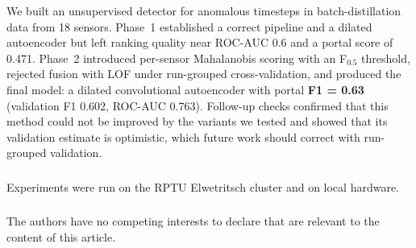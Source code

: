 \documentclass[runningheads]{llncs}
\begin{document}
We built an unsupervised detector for anomalous timesteps in batch-distillation data from 18 sensors. Phase~1 established a correct pipeline and a dilated autoencoder but left ranking quality near ROC-AUC 0.6 and a portal score of 0.471. Phase~2 introduced per-sensor Mahalanobis scoring with an F$_{0.5}$ threshold, rejected fusion with LOF under run-grouped cross-validation, and produced the final model: a dilated convolutional autoencoder with portal \textbf{F1 = 0.63} (validation F1 0.602, ROC-AUC 0.763). Follow-up checks confirmed that this method could not be improved by the variants we tested and showed that its validation estimate is optimistic, which future work should correct with run-grouped validation.

\begin{credits}
\subsubsection{\ackname}
Experiments were run on the RPTU Elwetritsch cluster and on local hardware.

\subsubsection{\discintname}
The authors have no competing interests to declare that are relevant to the content of this article.
\end{credits}



\end{document}
